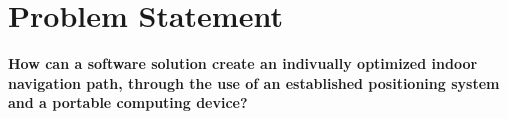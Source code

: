 \chapter{Problem Statement}

\textbf{How can a software solution create an indivually optimized indoor navigation path, through the use of an established positioning system and a portable computing device?}
